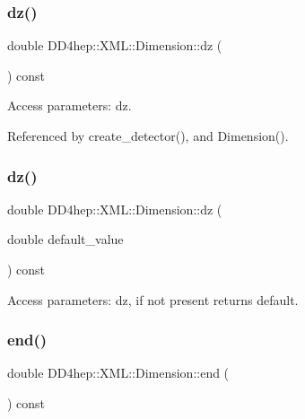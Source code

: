 \subsubsection{\texorpdfstring{dz()}{dz()}\hspace{0.1cm}{\footnotesize\ttfamily [1/2]}}
{\footnotesize\ttfamily double D\+D4hep\+::\+X\+M\+L\+::\+Dimension\+::dz (\begin{DoxyParamCaption}{ }\end{DoxyParamCaption}) const}



Access parameters\+: dz. 



Referenced by create\+\_\+detector(), and Dimension().

\hypertarget{struct_d_d4hep_1_1_x_m_l_1_1_dimension_a8d7eeaac78ca77b3f07b04fabb42c449}{}\label{struct_d_d4hep_1_1_x_m_l_1_1_dimension_a8d7eeaac78ca77b3f07b04fabb42c449} 
\subsubsection{\texorpdfstring{dz()}{dz()}\hspace{0.1cm}{\footnotesize\ttfamily [2/2]}}
{\footnotesize\ttfamily double D\+D4hep\+::\+X\+M\+L\+::\+Dimension\+::dz (\begin{DoxyParamCaption}\item[{double}]{default\+\_\+value }\end{DoxyParamCaption}) const}



Access parameters\+: dz, if not present returns default. 

\hypertarget{struct_d_d4hep_1_1_x_m_l_1_1_dimension_a9e47548fd8406192455f22c25073987d}{}\label{struct_d_d4hep_1_1_x_m_l_1_1_dimension_a9e47548fd8406192455f22c25073987d} 
\subsubsection{\texorpdfstring{end()}{end()}\hspace{0.1cm}{\footnotesize\ttfamily [1/2]}}
{\footnotesize\ttfamily double D\+D4hep\+::\+X\+M\+L\+::\+Dimension\+::end (\begin{DoxyParamCaption}{ }\end{DoxyParamCaption}) const}



